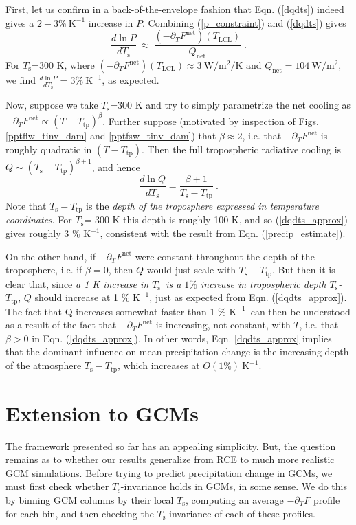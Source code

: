 \documentclass[9pt,twocolumn,twoside,lineno]{pnas-new}
\newcommand{\beqn}{\begin{equation}}
\newcommand{\eeqn}{\end{equation}}
\newcommand{\eqnref}[1]{(\ref{#1})}
\newcommand{\ppt}{\ensuremath{\partial_T}}
\newcommand{\Qnet}{\ensuremath{Q_\mathrm{net}}}
\newcommand{\Fnet}{\ensuremath{F^\mathrm{net}}}
\newcommand{\Wmsq}{\ensuremath{\mathrm{W/m^2}}}
\newcommand{\Ts}{\ensuremath{T_\mathrm{s}}}
\newcommand{\Tlcl}{\ensuremath{T_\mathrm{LCL}}}
\newcommand{\Ttp}{\ensuremath{T_\mathrm{tp}}}
\newcommand{\Kinverse}{\ensuremath{\mathrm{K^{-1}}}}
\begin{document}
First, let us confirm in a back-of-the-envelope fashion that Eqn. \eqnref{dqdts} indeed gives a $2 -3\%\ \Kinverse$ increase in $P$. Combining \eqnref{p_constraint} and \eqnref{dqdts} gives
	\beqn
		\frac{d \ln  P}{d \Ts} \ \approx\  \frac{(-\ppt \Fnet)(\Tlcl)}{\Qnet} \; .
	\label{precip_estimate}
	\eeqn
For \Ts=300 K, where $(-\ppt \Fnet)(\Tlcl) \approx 3 \ \Wmsq/\mathrm{K}$ and $\Qnet =  104\ \Wmsq$, we find $\frac{d \ln  P}{d \Ts}=  3\%\ \Kinverse$, as expected.

Now, suppose we take \Ts=300 K and  try to simply parametrize the net cooling as $-\ppt \Fnet \propto (T-\Ttp)^\beta$.  Further suppose (motivated by inspection of Figs. \ref{pptflw_tinv_dam} and \ref{pptfsw_tinv_dam})  that $\beta \approx 2$, i.e. that $-\ppt \Fnet$ is roughly quadratic  in $(T-\Ttp)$. Then the full tropospheric radiative cooling is $Q\sim (\Ts-\Ttp)^{\beta+1}$, and hence 
	\beqn
		\frac{d \ln Q}{d \Ts}  =  \frac{\beta+1}{\Ts-\Ttp}\ . \label{dqdts_approx}
	\eeqn
Note that $\Ts-\Ttp$ is the \emph{depth of the troposphere expressed in temperature coordinates}. For  \Ts= 300 K this depth is roughly 100 K, and so \eqnref{dqdts_approx} gives roughly 3 \% \Kinverse, consistent with the result from Eqn. \eqnref{precip_estimate}.

On the other hand, if $-\ppt \Fnet$ were constant throughout the depth of the troposphere, i.e. if $\beta=0$, then $Q$ would just scale with $\Ts-\Ttp$. But then it is clear that, since \emph{a 1 K increase in \Ts\  is a $1\%$ increase in tropospheric depth \Ts-\Ttp}, $Q$ should increase at 1 \% \Kinverse, just as expected from Eqn. \eqnref{dqdts_approx}. The fact that Q increases somewhat faster than 1 \% \Kinverse\  can then be understood as a result of the fact that $-\ppt \Fnet$ is increasing, not constant, with $T$, i.e. that $\beta>0$ in Eqn. \eqnref{dqdts_approx}. In other words, Eqn. \ref{dqdts_approx} implies that the dominant influence on mean precipitation change is the increasing depth of the atmosphere $\Ts-\Ttp$, which increases at $O(1\%)\ \Kinverse$.



\section{Extension to GCMs} \label{sec_GCMs}
The framework presented so far has an appealing simplicity. But, the question remains as to whether our results generalize from RCE to much more realistic GCM simulations. Before trying to predict precipitation change in GCMs,  we must first check  whether \Ts-invariance holds in GCMs, in some sense. We do this by binning  GCM columns by their local \Ts, computing an average $-\ppt F$ profile for each bin, and then checking the \Ts-invariance of each of these profiles. 
\end{document}
